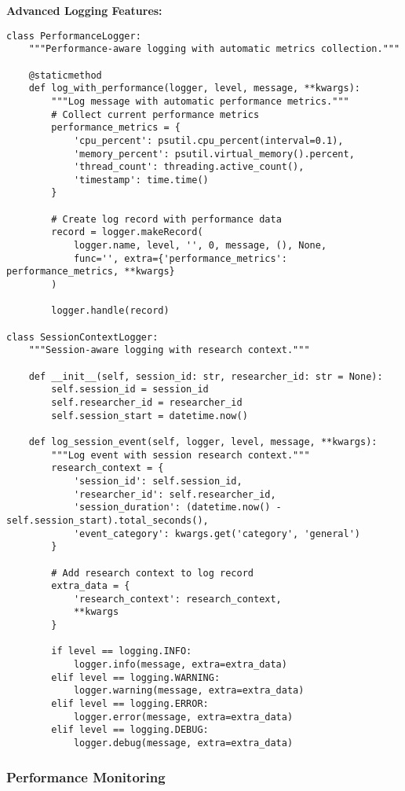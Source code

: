 \documentclass[11pt,a4paper]{article}
\begin{document}
\textbf{Advanced Logging Features:}

\begin{verbatim}
class PerformanceLogger:
    """Performance-aware logging with automatic metrics collection."""

    @staticmethod
    def log_with_performance(logger, level, message, **kwargs):
        """Log message with automatic performance metrics."""
        # Collect current performance metrics
        performance_metrics = {
            'cpu_percent': psutil.cpu_percent(interval=0.1),
            'memory_percent': psutil.virtual_memory().percent,
            'thread_count': threading.active_count(),
            'timestamp': time.time()
        }

        # Create log record with performance data
        record = logger.makeRecord(
            logger.name, level, '', 0, message, (), None,
            func='', extra={'performance_metrics': performance_metrics, **kwargs}
        )

        logger.handle(record)

class SessionContextLogger:
    """Session-aware logging with research context."""

    def __init__(self, session_id: str, researcher_id: str = None):
        self.session_id = session_id
        self.researcher_id = researcher_id
        self.session_start = datetime.now()

    def log_session_event(self, logger, level, message, **kwargs):
        """Log event with session research context."""
        research_context = {
            'session_id': self.session_id,
            'researcher_id': self.researcher_id,
            'session_duration': (datetime.now() - self.session_start).total_seconds(),
            'event_category': kwargs.get('category', 'general')
        }

        # Add research context to log record
        extra_data = {
            'research_context': research_context,
            **kwargs
        }

        if level == logging.INFO:
            logger.info(message, extra=extra_data)
        elif level == logging.WARNING:
            logger.warning(message, extra=extra_data)
        elif level == logging.ERROR:
            logger.error(message, extra=extra_data)
        elif level == logging.DEBUG:
            logger.debug(message, extra=extra_data)
\end{verbatim}

\subsubsection{Performance Monitoring}
\end{document}
